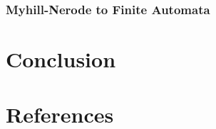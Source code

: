 \documentclass[11pt,a4paper,oneside]{book}
\begin{document}
            \subsection{Myhill-Nerode to Finite Automata}

                \paragraph{}


    \chapter{Conclusion}

    \chapter{References}

    \nocite{*}

    {}
    
\end{document}
